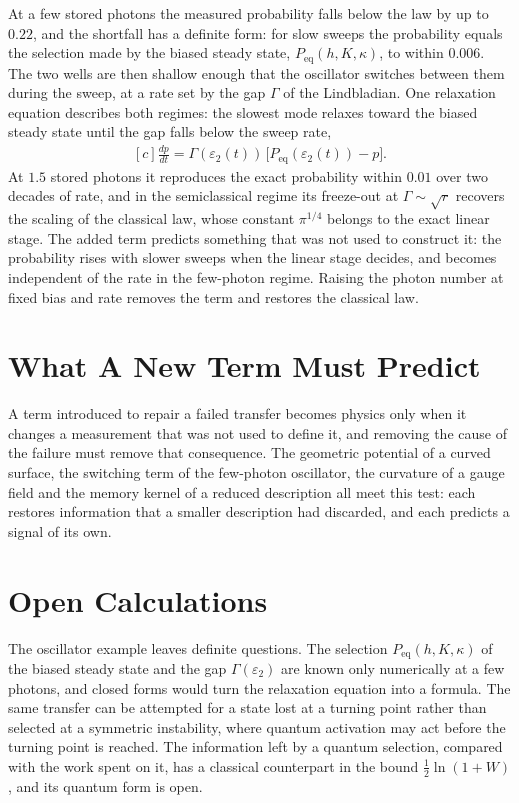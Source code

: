 \documentclass[11pt,oneside]{book}
\newenvironment{centeredalign}{\[\begin{gathered}[c]}{\end{gathered}\]}
\begin{document}
At a few stored photons the measured probability falls below the law by up to \(0.22\), and the shortfall has a definite
form: for slow sweeps the probability equals the selection made by the biased steady state, \(P_{\mathrm{eq}}(h,K,\kappa)\),
to within \(0.006\). The two wells are then shallow enough that the oscillator switches between them during the sweep,
at a rate set by the gap \(\Gamma\) of the Lindbladian. One relaxation equation describes both regimes: the slowest mode
relaxes toward the biased steady state until the gap falls below the sweep rate,
\begin{centeredalign}
\frac{dp}{dt}=\Gamma(\varepsilon_2(t))\,\bigl[P_{\mathrm{eq}}(\varepsilon_2(t))-p\bigr].
\end{centeredalign}
At \(1.5\) stored photons it reproduces the exact probability within \(0.01\) over two decades of rate, and in the
semiclassical regime its freeze-out at \(\Gamma\sim\sqrt r\) recovers the scaling of the classical law, whose constant
\(\pi^{1/4}\) belongs to the exact linear stage. The added term predicts something that was not used to construct it:
the probability rises with slower sweeps when the linear stage decides, and becomes independent of the rate in the
few-photon regime. Raising the photon number at fixed bias and rate removes the term and restores the classical law.

\section{What A New Term Must Predict}
A term introduced to repair a failed transfer becomes physics only when it changes a measurement that was not used to
define it, and removing the cause of the failure must remove that consequence. The geometric potential of a curved
surface, the switching term of the few-photon oscillator, the curvature of a gauge field and the memory kernel of a
reduced description all meet this test: each restores information that a smaller description had discarded, and each
predicts a signal of its own.

\section{Open Calculations}
The oscillator example leaves definite questions. The selection \(P_{\mathrm{eq}}(h,K,\kappa)\) of the biased steady
state and the gap \(\Gamma(\varepsilon_2)\) are known only numerically at a few photons, and closed forms would turn the
relaxation equation into a formula. The same transfer can be attempted for a state lost at a turning point rather than
selected at a symmetric instability, where quantum activation may act before the turning point is reached. The
information left by a quantum selection, compared with the work spent on it, has a classical counterpart in the bound
\(\tfrac12\ln(1+W)\), and its quantum form is open.
\end{document}

